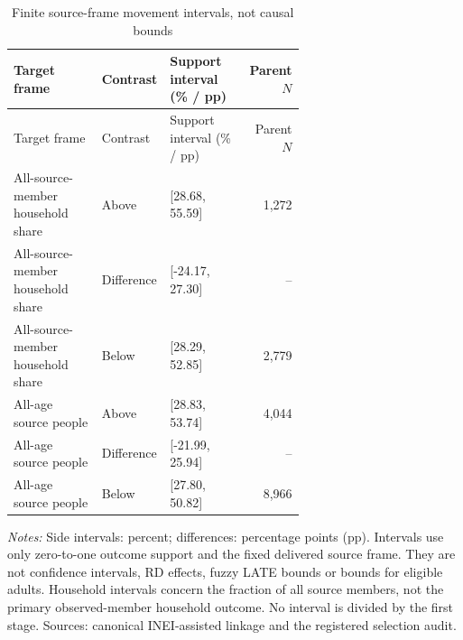 \begingroup\fontsize{9.25}{11.4}\selectfont\setlength{\tabcolsep}{3pt}
\renewcommand{\arraystretch}{1.18}\begin{longtable}{@{}>{\raggedright\arraybackslash}p{0.34\linewidth}lp{0.30\linewidth}r@{}}
\caption{Finite source-frame movement intervals, not causal bounds}\label{tab:pub_A25} \\
\toprule Target frame & Contrast & Support interval (\% / pp) & Parent \(N\) \\ \midrule\endfirsthead
\toprule Target frame & Contrast & Support interval (\% / pp) & Parent \(N\) \\ \midrule\endhead
All-source-member household share & Above & [28.68, 55.59] & 1,272 \\
All-source-member household share & Difference & [-24.17, 27.30] & -- \\
All-source-member household share & Below & [28.29, 52.85] & 2,779 \\
All-age source people & Above & [28.83, 53.74] & 4,044 \\
All-age source people & Difference & [-21.99, 25.94] & -- \\
All-age source people & Below & [27.80, 50.82] & 8,966 \\
\bottomrule\end{longtable}{\footnotesize\textit{Notes:} Side intervals: percent; differences: percentage points (pp). Intervals use only zero-to-one outcome support and the fixed delivered source frame. They are not confidence intervals, RD effects, fuzzy LATE bounds or bounds for eligible adults. Household intervals concern the fraction of all source members, not the primary observed-member household outcome. No interval is divided by the first stage. Sources: canonical INEI-assisted linkage and the registered selection audit.}\par\endgroup
